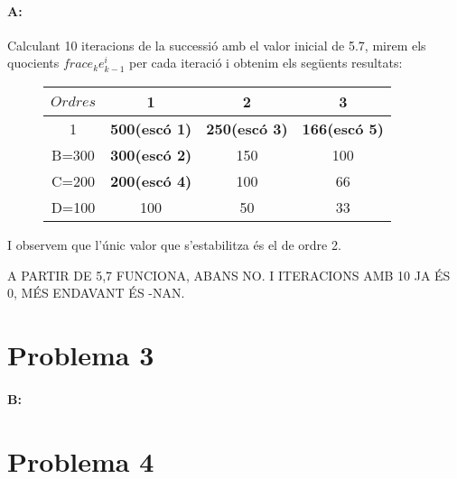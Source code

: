 \documentclass{article}
\begin{document}
	\paragraph{A:} Calculant 10 iteracions de la successió amb el valor inicial de 5.7, mirem els quocients $frac{e_{k}}{e_{k-1}^i}$ per cada iteració i obtenim els següents resultats:
	    \begin{figure}[h!]
		\begin{center}	
			\begin{tabular}{|c|c|c|c|}
				\hline $Ordres$ & 1 & 2 & 3 \\
				\hline 1 & \textbf{500(escó 1)} & \textbf{250(escó 3)} & \textbf{166(escó 5)} \\
				\hline B=300 & \textbf{300(escó 2)} & 150 & 100 \\
				\hline C=200 & \textbf{200(escó 4)} & 100 & 66 \\
				\hline D=100 & 100 & 50 & 33 \\
				\hline
			\end{tabular}
		\end{center}
	\end{figure} 
	
	I observem que l'únic valor que s'estabilitza és el de ordre 2.
	
	A PARTIR DE 5,7 FUNCIONA, ABANS NO. I ITERACIONS AMB 10 JA ÉS 0, MÉS ENDAVANT ÉS -NAN.
	
	\newpage
	
	\section{Problema 3}
	\paragraph{B:} 
	
	\newpage
	
	\section{Problema 4}

	
\end{document}
